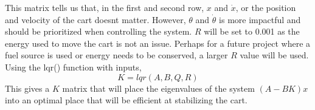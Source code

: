 \documentclass{article}
\begin{document}
This matrix tells us that, in the first and second row, $x$ and $\dot{x}$, or the position and velocity of the cart 
doesnt matter. However, $\theta$ and $\dot{\theta}$ is more impactful and should be prioritized when controlling the system.
$R$ will be set to 0.001 as the energy used to move the cart is not an issue. Perhaps for a future project where a fuel source
is used or energy needs to be conserved, a larger $R$ value will be used. Using the lqr() function with inputs,
\[K=lqr(A, B, Q, R)\]
This gives a $K$ matrix that will place the eigenvalues of the system $(A-BK)x$ into an optimal place that
will be efficient at stabilizing the cart. 
\end{document}
